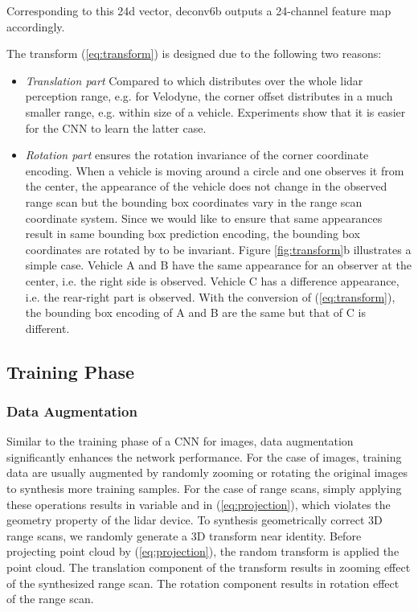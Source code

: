 \documentclass[conference]{IEEEtran}
\begin{document}
Corresponding to this 24d vector, deconv6b outputs a 24-channel feature map accordingly.

The transform (\ref{eq:transform}) is designed due to the following two reasons:
\begin{itemize}
\item \textit{Translation part} Compared to  which distributes over the whole lidar perception range, e.g.  for Velodyne, the corner offset  distributes in a much smaller range, e.g. within size of a vehicle. Experiments show that it is easier for the CNN to learn the latter case.
\item \textit{Rotation part}  ensures the rotation invariance of the corner coordinate encoding. When a vehicle is moving around a circle and one observes it from the center, the appearance of the vehicle does not change in the observed range scan but the bounding box coordinates vary in the range scan coordinate system. Since we would like to ensure that same appearances result in same bounding box prediction encoding, the bounding box coordinates are rotated by  to be invariant. Figure \ref{fig:transform}b illustrates a simple case. Vehicle A and B have the same appearance for an observer at the center, i.e. the right side is observed. Vehicle C has a difference appearance, i.e. the rear-right part is observed. With the conversion of (\ref{eq:transform}), the bounding box encoding  of A and B are the same but that of C is different.
\end{itemize}

\subsection{Training Phase}
\subsubsection{Data Augmentation}
Similar to the training phase of a CNN for images, data augmentation significantly enhances the network performance. For the case of images, training data are usually augmented by randomly zooming or rotating the original images to synthesis more training samples. For the case of range scans, simply applying these operations results in variable  and  in (\ref{eq:projection}), which violates the geometry property of the lidar device. To synthesis geometrically correct 3D range scans, we randomly generate a 3D transform near identity. Before projecting point cloud by (\ref{eq:projection}), the random transform is applied the point cloud. The translation component of the transform results in zooming effect of the synthesized range scan. The rotation component results in rotation effect of the range scan. 
\end{document}
